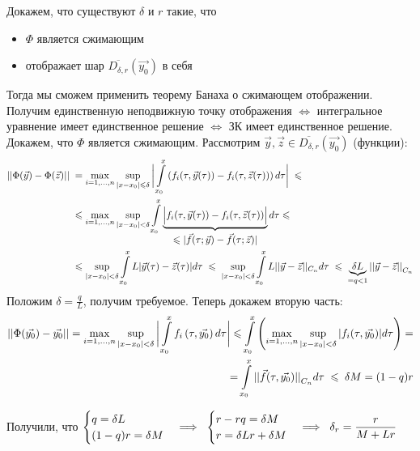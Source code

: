 \noindent Докажем, что существуют $\delta$ и $r$ такие, что 
\begin{itemize}
    \item $\Phi$ является сжимающим
    \item отображает шар $\overline{D_{\delta, r}} (\vec{y_0})$ в себя 
\end{itemize}
Тогда мы сможем применить теорему Банаха о сжимающем отображении. Получим единственную неподвижную точку отображения $\Leftrightarrow$ интегральное уравнение имеет единственное решение $\Leftrightarrow$ ЗК имеет единственное решение.
\bigbreak
Докажем, что $\Phi$ является сжимающим. Рассмотрим $\vec{y}, \vec{z} \in \overline{D_{\delta, r}} (\vec{y_0})$ (функции): 
\begin{align*}
    ||\Phi(\vec{y}) - \Phi(\vec{z})|| \; &= \max \limits_{i = 1, \dots, n} \sup \limits_{|x - x_0| \leqslant \delta} \bigg|\int \limits_{x_0}^{x} \brackets{f_i(\tau, \vec{y}(\tau)) - f_i (\tau, \vec{z}(\tau))}d\tau\bigg| \; \leqslant \\
    &\leqslant \max \limits_{i = 1, \dots, n} \sup \limits_{|x - x_0| < \delta} \int \limits_{x_0}^x \underbrace{\Big|f_i(\tau, \vec{y}(\tau)) - f_i (\tau, \vec{z}(\tau))\Big|}_{\mathlarger{\leqslant |\vec{f}(\tau; \vec{y}) - \vec{f}(\tau; \vec{z})|}} d\tau \leqslant \\
    &\leqslant \sup \limits_{|x - x_0| < \delta} \int \limits_{x_0}^{x} L |\vec{y}(\tau) - \vec{z}(\tau)|d\tau \;\leqslant\; \sup \limits_{|x - x_0| < \delta} \int \limits_{x_0}^{x} L ||\vec{y} - \vec{z}||_{C_n} d\tau \; \leqslant \; \underbrace{\delta L}_{=q < 1} {||\vec{y} - \vec{z}||}_{C_n}
\end{align*}
Положим $\delta = \frac{q}{L}$, получим требуемое.
\bigbreak
Теперь докажем вторую часть:
\begin{align*}
    ||\Phi(\vec{y_0}) - \vec{y_0}|| = \max \limits_{i = 1, \dots, n} \sup \limits_{|x - x_0| < \delta} \bigg|\int \limits_{x_0}^x f_i \left({\tau, \vec{y_0}}\right) d\tau\bigg|
    \leqslant \int \limits_{x_0}^x \left({\max \limits_{i = 1, \dots, n} \sup \limits_{|x - x_0| < \delta} |f_i (\tau, \vec{y_0})| d\tau}\right) = \\
    = \int \limits_{x_0}^{x} {||\vec{f}(\tau, \vec{y_0})||}_{C_n} d\tau \;\leqslant \; \delta M = (1 - q) r
\end{align*}

Получили, что $\begin{cases} q = \delta L \\ (1 - q)r = \delta M \end{cases} \Longrightarrow \;\; \begin{cases} r - rq = \delta M \\ r = \delta L r + \delta M \end{cases} \Longrightarrow  \;\;\delta_r = \mathlarger{\frac{r}{M + Lr}}$ \qquad \EndProof

